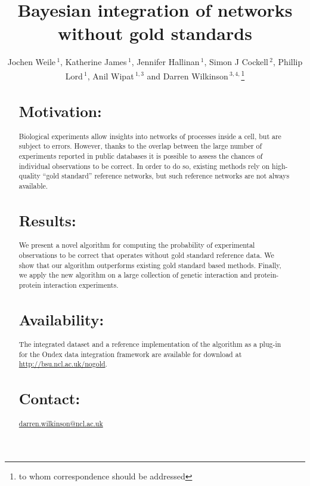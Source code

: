 \documentclass{bioinfo}
\begin{document}

\title[Bayesian integration of networks without gold standards]{Bayesian integration of networks without gold standards}

\author[J. Weile \textit{et~al.}]{Jochen Weile\,$^{1}$, Katherine James\,$^{1}$, Jennifer Hallinan\,$^{1}$, Simon J Cockell\,$^{2}$, Phillip Lord\,$^{1}$, Anil Wipat\,$^{1,3}$ and Darren Wilkinson\,$^{3,4,}$\footnote{to whom correspondence should be addressed}}

\address{$^{1}$School of Computing Science, $^{2}$Bioinformatics Support Unit, $^{3}$Centre for Integrative Systems Biology of Ageing and Nutrition, $^{4}$School of Mathematics and Statistics, Newcastle University, Newcastle upon Tyne NE1 7RU, United Kingdom}



\maketitle

\begin{abstract}
\section{Motivation:}
Biological experiments allow insights into networks of processes inside a cell, but are subject to errors. However, thanks to the overlap between the large number of experiments reported in public databases it is possible to assess the chances of individual observations to be correct. In order to do so, existing methods rely on high-quality ``gold standard'' reference networks, but such reference networks are not always available.

\section{Results:}
We present a novel algorithm for computing the probability of experimental observations to be correct that operates without gold standard reference data. We show that our algorithm outperforms existing gold standard based methods. Finally, we apply the new algorithm on a large collection of genetic interaction and protein-protein interaction experiments.

\section{Availability:}
The integrated dataset and a reference implementation of the algorithm as a plug-in for the Ondex data integration framework are available for download at \href{http://bsu.ncl.ac.uk/nogold}{http://bsu.ncl.ac.uk/nogold}.

\section{Contact:} \href{darren.wilkinson@ncl.ac.uk}{darren.wilkinson@ncl.ac.uk}
\end{abstract}
\end{document}
